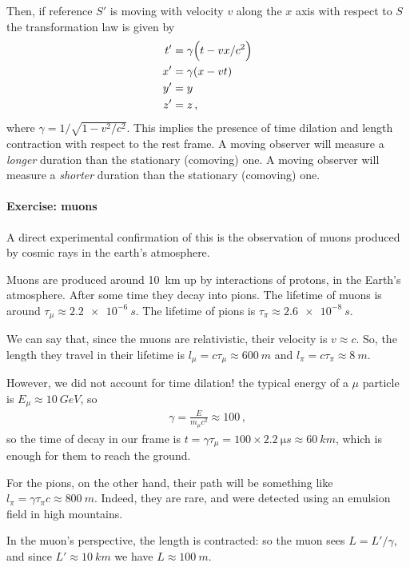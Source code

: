 \documentclass[main.tex]{subfiles}
\begin{document}
Then, if reference \(S'\) is moving with velocity \(v\) along the \(x\) axis with respect to \(S\) the transformation law is given by 
%
\begin{align}
t' &= \gamma \qty(t - vx / c^2)  \\
x' &= \gamma \qty(x - vt)  \\
y' &= y  \\
z' &= z
\,,
\end{align}
%
where \(\gamma = 1 / \sqrt{ 1 -  v^2 / c^2}\).
This implies the presence of time dilation and length contraction with respect to the rest frame. 
A moving observer will measure a \emph{longer} duration than the stationary (comoving) one. 
A moving observer will measure a \emph{shorter} duration than the stationary (comoving) one.

\paragraph{Exercise: muons}

A direct experimental confirmation of this is the observation of muons produced by cosmic rays in the earth's atmosphere. 

Muons are produced around \SI{10}{km} up by interactions of protons, in the Earth's atmosphere. 
After some time they decay into pions. 
The lifetime of muons is around \(\tau_{\mu } \approx \SI{2.2e-6}{s}\). The lifetime of pions is \(\tau_{\pi } \approx \SI{2.6e-8}{s}\).

We can say that, since the muons are relativistic, their velocity is \(v \approx c\). So, the length they travel in their lifetime is \(l_{\mu } = c \tau_{\mu } \approx \SI{600}{m}\) and \(l_{\pi } = c \tau_{\pi } \approx \SI{8}{m}\). 

However, we did not account for time dilation! the typical energy of a \(\mu \) particle is \(E_{\mu } \approx \SI{10}{GeV}\), so 
%
\begin{align}
\gamma = \frac{E}{m_\mu c^2} \approx 100
\,,
\end{align}
%
so the time of decay in our frame is \(t = \gamma \tau_{\mu } = 100 \times \SI{2.2}{\micro s} \approx \SI{60}{km}\), which is enough for them to reach the ground.

For the pions, on the other hand, their path will be something like \(l_{\pi } = \gamma \tau_{\pi } c \approx
\SI{800}{m} \). Indeed, they are rare, and were detected using an emulsion field in high mountains. 

In the muon's perspective, the length is contracted: so the muon sees \(L = L' / \gamma \), and since \(L' \approx \SI{10}{km}\) we have  \(L \approx \SI{100}{m}\).
\end{document}
